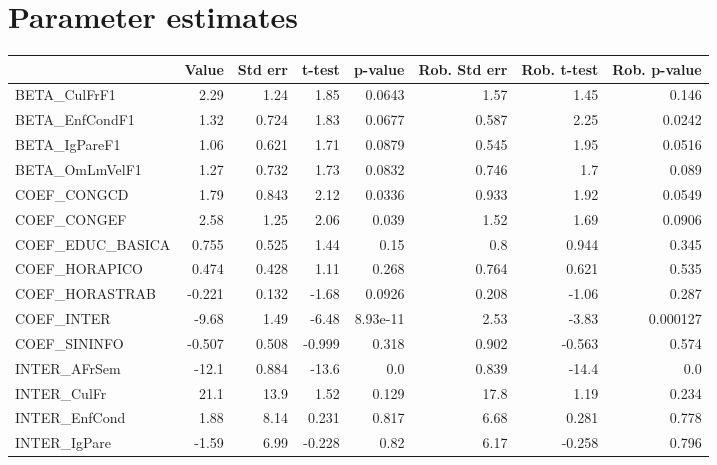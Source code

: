 \section{Parameter estimates}
\begin{tabular}{lrrrrrrr}
\toprule
{} &  Value &  Std err &  t-test &  p-value &  Rob. Std err &  Rob. t-test &  Rob. p-value \\
\midrule
BETA\_CulFrF1       &   2.29 &     1.24 &    1.85 &   0.0643 &          1.57 &         1.45 &         0.146 \\
BETA\_EnfCondF1     &   1.32 &    0.724 &    1.83 &   0.0677 &         0.587 &         2.25 &        0.0242 \\
BETA\_IgPareF1      &   1.06 &    0.621 &    1.71 &   0.0879 &         0.545 &         1.95 &        0.0516 \\
BETA\_OmLmVelF1     &   1.27 &    0.732 &    1.73 &   0.0832 &         0.746 &          1.7 &         0.089 \\
COEF\_CONGCD        &   1.79 &    0.843 &    2.12 &   0.0336 &         0.933 &         1.92 &        0.0549 \\
COEF\_CONGEF        &   2.58 &     1.25 &    2.06 &    0.039 &          1.52 &         1.69 &        0.0906 \\
COEF\_EDUC\_BASICA   &  0.755 &    0.525 &    1.44 &     0.15 &           0.8 &        0.944 &         0.345 \\
COEF\_HORAPICO      &  0.474 &    0.428 &    1.11 &    0.268 &         0.764 &        0.621 &         0.535 \\
COEF\_HORASTRAB     & -0.221 &    0.132 &   -1.68 &   0.0926 &         0.208 &        -1.06 &         0.287 \\
COEF\_INTER         &  -9.68 &     1.49 &   -6.48 & 8.93e-11 &          2.53 &        -3.83 &      0.000127 \\
COEF\_SININFO       & -0.507 &    0.508 &  -0.999 &    0.318 &         0.902 &       -0.563 &         0.574 \\
INTER\_AFrSem       &  -12.1 &    0.884 &   -13.6 &      0.0 &         0.839 &        -14.4 &           0.0 \\
INTER\_CulFr        &   21.1 &     13.9 &    1.52 &    0.129 &          17.8 &         1.19 &         0.234 \\
INTER\_EnfCond      &   1.88 &     8.14 &   0.231 &    0.817 &          6.68 &        0.281 &         0.778 \\
INTER\_IgPare       &  -1.59 &     6.99 &  -0.228 &     0.82 &          6.17 &       -0.258 &         0.796 \\

\end{tabular}
